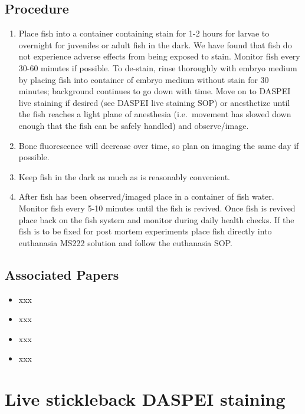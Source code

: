 \documentclass[
  letterpaper,
  DIV=11,
  numbers=noendperiod]{scrreprt}
\providecommand{\tightlist}{%
  \setlength{\itemsep}{0pt}\setlength{\parskip}{0pt}}\usepackage{longtable,booktabs,array}
\begin{document}
\hypertarget{procedure-73}{%
\section{Procedure}\label{procedure-73}}

\begin{enumerate}
\def\labelenumi{\arabic{enumi}.}
\tightlist
\item
  Place fish into a container containing stain for 1-2 hours for larvae
  to overnight for juveniles or adult fish in the dark. We have found
  that fish do not experience adverse effects from being exposed to
  stain. Monitor fish every 30-60 minutes if possible. To de-stain,
  rinse thoroughly with embryo medium by placing fish into container of
  embryo medium without stain for 30 minutes; background continues to go
  down with time. Move on to DASPEI live staining if desired (see DASPEI
  live staining SOP) or anesthetize until the fish reaches a light plane
  of anesthesia (i.e.~movement has slowed down enough that the fish can
  be safely handled) and observe/image.
\item
  Bone fluorescence will decrease over time, so plan on imaging the same
  day if possible.
\item
  Keep fish in the dark as much as is reasonably convenient.
\item
  After fish has been observed/imaged place in a container of fish
  water. Monitor fish every 5-10 minutes until the fish is revived. Once
  fish is revived place back on the fish system and monitor during daily
  health checks. If the fish is to be fixed for post mortem experiments
  place fish directly into euthanasia MS222 solution and follow the
  euthanasia SOP.
\end{enumerate}

\hypertarget{associated-papers-50}{%
\section{Associated Papers}\label{associated-papers-50}}

\begin{itemize}
\tightlist
\item
  xxx
\item
  xxx
\item
  xxx
\item
  xxx
\end{itemize}

\hypertarget{sec-vert_exp-live_daspei_SB}{%
\chapter{Live stickleback DASPEI
staining}\label{sec-vert_exp-live_daspei_SB}}
\end{document}
